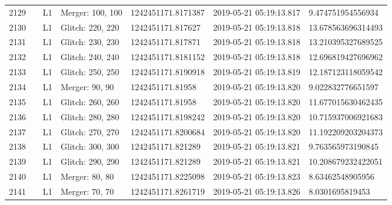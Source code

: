 \begin{longtable}{lllllll}
2129 &                                                    &       L1 &  Merger: 100, 100 &  1242451171.8171387 &  2019-05-21 05:19:13.817 &   9.474751954556934 \\
2130 &                                                    &       L1 &  Glitch: 220, 220 &   1242451171.817627 &  2019-05-21 05:19:13.818 &  13.678563696314493 \\
2131 &                                                    &       L1 &  Glitch: 230, 230 &   1242451171.817871 &  2019-05-21 05:19:13.818 &  13.210395327689525 \\
2132 &                                                    &       L1 &  Glitch: 240, 240 &  1242451171.8181152 &  2019-05-21 05:19:13.818 &  12.696819427696962 \\
2133 &                                                    &       L1 &  Glitch: 250, 250 &  1242451171.8190918 &  2019-05-21 05:19:13.819 &  12.187123118059542 \\
2134 &                                                    &       L1 &    Merger: 90, 90 &    1242451171.81958 &  2019-05-21 05:19:13.820 &   9.022832776651597 \\
2135 &                                                    &       L1 &  Glitch: 260, 260 &    1242451171.81958 &  2019-05-21 05:19:13.820 &  11.677015630462435 \\
2136 &                                                    &       L1 &  Glitch: 280, 280 &  1242451171.8198242 &  2019-05-21 05:19:13.820 &  10.715937006921683 \\
2137 &                                                    &       L1 &  Glitch: 270, 270 &  1242451171.8200684 &  2019-05-21 05:19:13.820 &  11.192209203204373 \\
2138 &                                                    &       L1 &  Glitch: 300, 300 &   1242451171.821289 &  2019-05-21 05:19:13.821 &   9.763565973190845 \\
2139 &                                                    &       L1 &  Glitch: 290, 290 &   1242451171.821289 &  2019-05-21 05:19:13.821 &  10.208679232422051 \\
2140 &                                                    &       L1 &    Merger: 80, 80 &  1242451171.8225098 &  2019-05-21 05:19:13.823 &    8.63462548905956 \\
2141 &                                                    &       L1 &    Merger: 70, 70 &  1242451171.8261719 &  2019-05-21 05:19:13.826 &     8.0301695819453 \\

\end{longtable}
